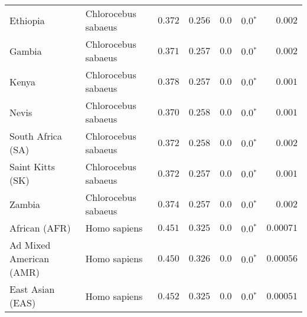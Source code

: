 \begin{center}
\begin{adjustbox}{width = 1\textwidth}
\begin{tabular}{|l|l|r|r|r|r|r|}
                       Ethiopia &  Chlorocebus sabaeus &                                           $ 0.372$ &                                           $ 0.256$ &            $0.0$ &                  $\bm{0.0{^*}}$ &           $ 0.002$ \\
                         Gambia &  Chlorocebus sabaeus &                                           $ 0.371$ &                                           $ 0.257$ &            $0.0$ &                  $\bm{0.0{^*}}$ &           $ 0.002$ \\
                          Kenya &  Chlorocebus sabaeus &                                           $ 0.378$ &                                           $ 0.257$ &            $0.0$ &                  $\bm{0.0{^*}}$ &           $ 0.001$ \\
                          Nevis &  Chlorocebus sabaeus &                                           $ 0.370$ &                                           $ 0.258$ &            $0.0$ &                  $\bm{0.0{^*}}$ &           $ 0.001$ \\
              South Africa (SA) &  Chlorocebus sabaeus &                                           $ 0.372$ &                                           $ 0.258$ &            $0.0$ &                  $\bm{0.0{^*}}$ &           $ 0.002$ \\
               Saint Kitts (SK) &  Chlorocebus sabaeus &                                           $ 0.372$ &                                           $ 0.257$ &            $0.0$ &                  $\bm{0.0{^*}}$ &           $ 0.001$ \\
                         Zambia &  Chlorocebus sabaeus &                                           $ 0.374$ &                                           $ 0.257$ &            $0.0$ &                  $\bm{0.0{^*}}$ &           $ 0.002$ \\
                  African (AFR) &         Homo sapiens &                                           $ 0.451$ &                                           $ 0.325$ &            $0.0$ &                  $\bm{0.0{^*}}$ &          $0.00071$ \\
        Ad Mixed American (AMR) &         Homo sapiens &                                           $ 0.450$ &                                           $ 0.326$ &            $0.0$ &                  $\bm{0.0{^*}}$ &          $0.00056$ \\
               East Asian (EAS) &         Homo sapiens &                                           $ 0.452$ &                                           $ 0.325$ &            $0.0$ &                  $\bm{0.0{^*}}$ &          $0.00051$ \\

\end{tabular}
\end{adjustbox}
\end{center}
